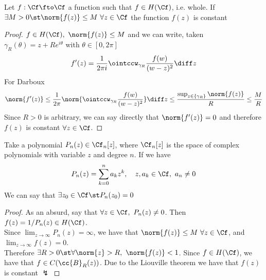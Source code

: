 \documentclass[../mmf.tex]{subfiles}
\begin{document}
					\begin{thm}[Liouville]
						Let $f:\Cf\fto\Cf$ a function such that $f\in H(\Cf)$, i.e. whole. If $\exists M>0\st\norm{f(z)}\le M\ \forall z\in\Cf$ the function $f(z)$ is constant
					\end{thm}
					\begin{proof}
						$f\in H(\Cf),\ \norm{f(z)}\le M$ and we can write, taken $\gamma_R(\theta)=z+Re^{i\theta}$ with $\theta\in[0,2\pi]$
	\begin{equation*}
		f'(z)=\frac{1}{2\pi i}\ointccw_{\gamma_R}\frac{f(w)}{(w-z)^2}\diff z
	\end{equation*}
	For Darboux
	\begin{equation*}
		\norm{f'(z)}\le\frac{1}{2\pi}\norm{\ointccw_{\gamma_R}\frac{f(w)}{(w-z)^2}}\diff z\le\frac{\sup_{z\in\{\gamma_R\}}\norm{f(z)}}{R}\le\frac{M}{R}
	\end{equation*}
	Since $R>0$ is arbitrary, we can say directly that $\norm{f'(z)}=0$ and therefore $f(z)$ is constant $\forall z\in\Cf$.
\end{proof}
\begin{thm}
	Take a polynomial $P_n(z)\in\Cf_n[z]$, where $\Cf_n[z]$ is the space of complex polynomials with variable $z$ and degree $n$. If we have
	\begin{equation*}
		P_n(z)=\sum_{k=0}^na_kz^k,\quad z,a_k\in\Cf,\ a_n\ne0
	\end{equation*}
	We can say that $\exists z_0\in\Cf\st P_n(z_0)=0$
\end{thm}
\begin{proof}
	As an absurd, say that $\forall z\in\Cf,\ P_n(z)\ne0$. Then $f(z)=1/P_n(z)\in H(\Cf)$.\\
	Since $\lim_{z\to\infty}P_n(z)=\infty$, we have that $\norm{f(z)}\le M\ \forall z\in\Cf$, and $\lim_{z\to\infty}f(z)=0$.\\
	Therefore $\exists R>0\st\forall\norm{z}>R,\ \norm{f(z)}<1$. Since $f\in H(\Cf)$, we have that $f\in C(\cc{B}_R(z))$. Due to the Liouville theorem we have that $f(z)$ is constant $\lightning$
\end{proof}
\end{document}
